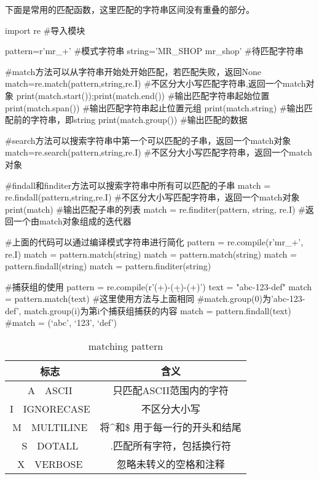     下面是常用的匹配函数，这里匹配的字符串区间没有重叠的部分。
    \begin{codeblock}[language=python, caption={string matching}]
      import re #导入模块

      pattern=r'mr_\w+' #模式字符串
      string='MR_SHOP mr_shop' #待匹配字符串

      #match方法可以从字符串开始处开始匹配，若匹配失败，返回None
      match=re.match(pattern,string,re.I) #不区分大小写匹配字符串,返回一个match对象
      print(match.start());print(match.end()) #输出匹配字符串起始位置
      print(match.span()) #输出匹配字符串起止位置元组
      print(match.string) #输出匹配前的字符串，即string
      print(match.group()) #输出匹配的数据

      #search方法可以搜索字符串中第一个可以匹配的子串，返回一个match对象
      match=re.search(pattern,string,re.I) #不区分大小写匹配字符串，返回一个match对象

      #findall和finditer方法可以搜索字符串中所有可以匹配的子串
      match = re.findall(pattern,string,re.I) #不区分大小写匹配字符串，返回一个match对象
      print(match) #输出匹配子串的列表
      match = re.finditer(pattern, string, re.I) #返回一个由match对象组成的迭代器

      #上面的代码可以通过编译模式字符串进行简化
      pattern = re.compile(r'mr_\w+', re.I)
      match = pattern.match(string)
      match = pattern.match(string)
      match = pattern.findall(string)
      match = pattern.finditer(string)

      #捕获组的使用
      pattern = re.compile(r'(\w+)-(\d+)-(\w+)')
      text = "abc-123-def"
      match = pattern.match(text) #这里使用方法与上面相同
      #match.group(0)为'abc-123-def', match.group(i)为第i个捕获组捕获的内容
      match = pattern.findall(text) #match = \lbrack(`abc', `123', `def')\rbrack
    \end{codeblock}

    \begin{table}[H]
      \centering
      \caption{matching pattern}
      \label{tab:matching pattern}
      \begin{tabular}{cc}
        \toprule[1.5pt]
        标志 & 含义 \\
        \midrule
        A~~ASCII & 只匹配ASCII范围内的字符 \\
        I~~IGNORECASE & 不区分大小写 \\
        M~~MULTILINE & 将\^{}和\$ 用于每一行的开头和结尾 \\
        S~~DOTALL & .匹配所有字符，包括换行符 \\
        X~~VERBOSE & 忽略未转义的空格和注释 \\
        \bottomrule[1.5pt]
      \end{tabular}
    \end{table}

